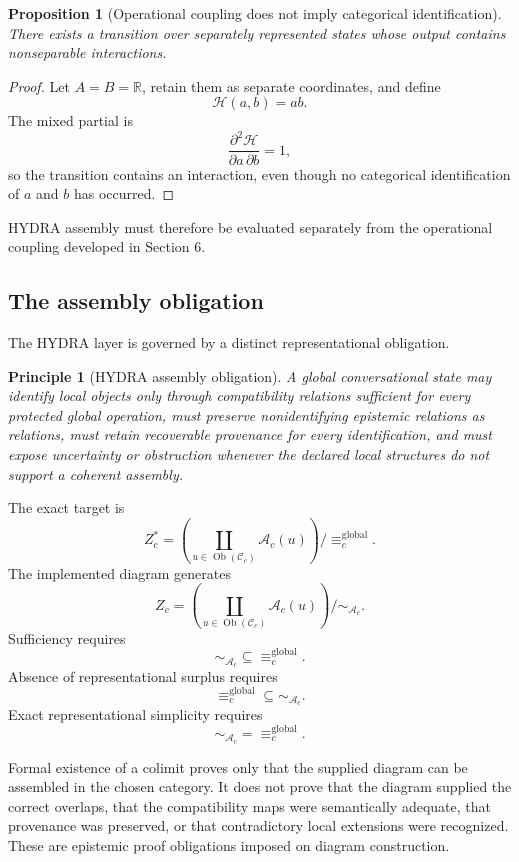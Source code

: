 \documentclass[11pt]{article}
\newtheorem{proposition}[definition]{Proposition}
\newtheorem{principle}[definition]{Principle}
\theoremstyle{definition}
\DeclareMathOperator{\Ob}{Ob}
\newcommand{\R}{\mathbb{R}}
\newcommand{\C}{\mathcal{C}}
\newcommand{\A}{\mathcal{A}}
\newcommand{\Hh}{\mathcal{H}}
\begin{document}
\begin{proposition}[Operational coupling does not imply categorical identification]
There exists a transition over separately represented states whose output contains nonseparable interactions.
\end{proposition}

\begin{proof}
Let \(A=B=\R\), retain them as separate coordinates, and define
\[
\Hh(a,b)=ab.
\]
The mixed partial is
\[
\frac{\partial^2\Hh}{\partial a\,\partial b}=1,
\]
so the transition contains an interaction, even though no categorical identification of \(a\) and \(b\) has occurred.
\end{proof}

HYDRA assembly must therefore be evaluated separately from the operational coupling developed in Section 6.

\subsection{The assembly obligation}

The HYDRA layer is governed by a distinct representational obligation.

\begin{principle}[HYDRA assembly obligation]
A global conversational state may identify local objects only through compatibility relations sufficient for every protected global operation, must preserve nonidentifying epistemic relations as relations, must retain recoverable provenance for every identification, and must expose uncertainty or obstruction whenever the declared local structures do not support a coherent assembly.
\end{principle}

The exact target is
\[
Z_c^{*}
=
\left(
\coprod_{u\in\Ob(\C_c)}
\A_c(u)
\right)
/{\equiv_c^{\mathrm{global}}}.
\]
The implemented diagram generates
\[
Z_c
=
\left(
\coprod_{u\in\Ob(\C_c)}
\A_c(u)
\right)
/{\sim_{\A_c}}.
\]
Sufficiency requires
\[
\sim_{\A_c}
\subseteq
\equiv_c^{\mathrm{global}}.
\]
Absence of representational surplus requires
\[
\equiv_c^{\mathrm{global}}
\subseteq
\sim_{\A_c}.
\]
Exact representational simplicity requires
\[
\sim_{\A_c}
=
\equiv_c^{\mathrm{global}}.
\]

Formal existence of a colimit proves only that the supplied diagram can be assembled in the chosen category. It does not prove that the diagram supplied the correct overlaps, that the compatibility maps were semantically adequate, that provenance was preserved, or that contradictory local extensions were recognized. These are epistemic proof obligations imposed on diagram construction.
\end{document}
